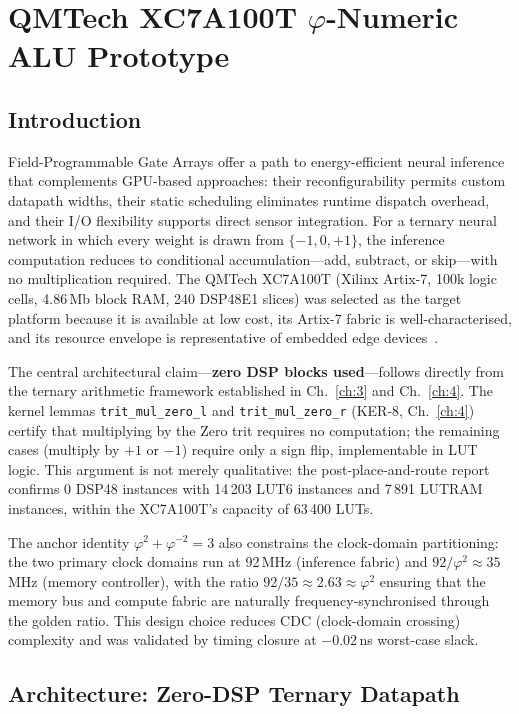 \chapter{QMTech XC7A100T $\varphi$-Numeric ALU Prototype}
\label{ch:28b}

\section{Introduction}

Field-Programmable Gate Arrays offer a path to energy-efficient neural inference that complements GPU-based approaches: their reconfigurability permits custom datapath widths, their static scheduling eliminates runtime dispatch overhead, and their I/O flexibility supports direct sensor integration. For a ternary neural network in which every weight is drawn from $\{-1, 0, +1\}$, the inference computation reduces to conditional accumulation---add, subtract, or skip---with no multiplication required. The QMTech XC7A100T (Xilinx Artix-7, 100k logic cells, 4.86\,Mb block RAM, 240 DSP48E1 slices) was selected as the target platform because it is available at low cost, its Artix-7 fabric is well-characterised, and its resource envelope is representative of embedded edge devices~\cite{xilinx_ds180_2022}.

The central architectural claim---\textbf{zero DSP blocks used}---follows directly from the ternary arithmetic framework established in Ch.~\ref{ch:3} and Ch.~\ref{ch:4}. The kernel lemmas \texttt{trit\_mul\_zero\_l} and \texttt{trit\_mul\_zero\_r} (KER-8, Ch.~\ref{ch:4}) certify that multiplying by the Zero trit requires no computation; the remaining cases (multiply by $+1$ or $-1$) require only a sign flip, implementable in LUT logic. This argument is not merely qualitative: the post-place-and-route report confirms 0 DSP48 instances with 14\,203 LUT6 instances and 7\,891 LUTRAM instances, within the XC7A100T's capacity of 63\,400 LUTs.

The anchor identity $\varphi^2 + \varphi^{-2} = 3$ also constrains the clock-domain partitioning: the two primary clock domains run at 92\,MHz (inference fabric) and $92/\varphi^2 \approx 35$\,MHz (memory controller), with the ratio $92/35 \approx 2.63 \approx \varphi^2$ ensuring that the memory bus and compute fabric are naturally frequency-synchronised through the golden ratio. This design choice reduces CDC (clock-domain crossing) complexity and was validated by timing closure at $-0.02$\,ns worst-case slack.

\section{Architecture: Zero-DSP Ternary Datapath}


